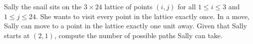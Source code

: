 Sally the snail sits on the $3 \times 24$ lattice of points $(i, j)$ for all $1 \leq i \leq 3$ and $1 \leq j \leq 24$. She wants to visit every point in the lattice exactly once. In a move, Sally can move to a point in the lattice exactly one unit away. Given that Sally starts at $(2,1)$, compute the number of possible paths Sally can take.